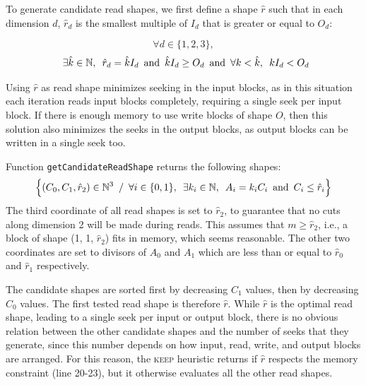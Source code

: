 \documentclass[sigconf, nonacm]{acmart}
\newcommand{\keep}[0]{\textsc{keep}\xspace}
\begin{document}

To generate candidate read shapes, we first define a shape $\hat r$ such
that in each dimension $d$, $\hat r_d$ is the smallest multiple of $I_d$
that is greater or equal to $O_d$:

\[
\forall d \in \{1, 2, 3\},
\]
\[
  \enskip \exists \hat k \in \mathbb{N}, \enskip \hat r_d = \hat kI_d \enskip \mathrm{and} \enskip \hat k I_d \geq O_d \enskip \mathrm{and} \enskip \forall k < \hat k, \enskip kI_d < O_d
\]

Using $\hat r$ as read shape minimizes seeking in the input blocks, as
in this situation each iteration reads input blocks completely, requiring a
single seek per input block. If there is enough memory to use write blocks
of shape $O$, then this solution also minimizes the seeks in the output
blocks, as output blocks can be written in a single seek too.

Function \texttt{getCandidateReadShape} returns the following shapes:
\[
  \Big\{ (C_0, C_1, \hat r_2) \in \mathbb{N}^3 \enskip / \enskip
          \forall i \in \{0, 1\}, \enskip \exists k_i \in \mathbb{N}, \enskip
           A_i = k_iC_i \enskip \mathrm{and} \enskip C_i \leq \hat r_i \Big\}
\]
The third coordinate of all read shapes is set to $\hat r_2$, to guarantee
that no cuts along dimension 2 will be made during reads. This assumes that
$m \geq \hat r_2$, i.e., a block of shape (1, 1, $\hat r_2$) fits in
memory, which seems reasonable. The other two coordinates are set to divisors of $A_0$ and $A_1$ which are
less than or equal to $\hat r_0$ and $\hat r_1$ respectively.

The candidate shapes are sorted first by decreasing $C_1$ values, then by
decreasing $C_0$ values. The first tested read shape is therefore
$\hat r$. While $\hat r$ is the optimal read shape, leading to a single
seek per input or output block, there is no obvious relation between the
other candidate shapes and the number of seeks that they generate, since
this number depends on how input, read, write, and output blocks are
arranged. For this reason, the \keep heuristic returns if $\hat r$
respects the memory constraint (line 20-23), but it otherwise evaluates all
the other read shapes.
\end{document}
